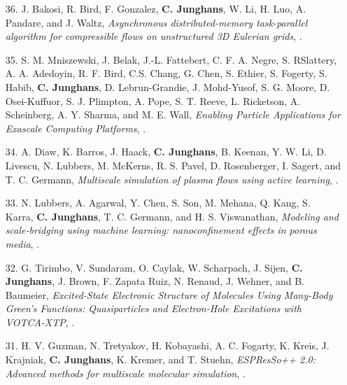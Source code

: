 \documentclass{article}
\begin{document}
\begin{enumerate}
\item[36.] J. Bakosi, R. Bird, F. Gonzalez, \textbf{C. Junghans}, W. Li, H. Luo, A. Pandare, and J. Waltz,
  \textit{Asynchronous distributed-memory task-parallel algorithm for compressible flows on unstructured 3D Eulerian grids},
  .

\item[35.] S. M. Mniszewski, J. Belak, J.-L. Fattebert, C. F. A. Negre, S. RSlattery, A. A. Adedoyin, R. F. Bird, C.S. Chang, G. Chen, S. Ethier, S. Fogerty, S. Habib, \textbf{C. Junghans}, D. Lebrun-Grandie, J. Mohd-Yusof, S. G. Moore, D. Osei-Kuffuor, S. J. Plimpton, A. Pope, S. T. Reeve, L. Ricketson, A. Scheinberg, A. Y. Sharma, and M. E. Wall,
  \textit{Enabling Particle Applications for Exascale Computing Platforms},
  .

\item[34.] A. Diaw, K. Barros, J. Haack, \textbf{C. Junghans}, B. Keenan, Y. W. Li, D. Livescu, N. Lubbers, M. McKerns, R. S. Pavel, D. Rosenberger, I. Sagert, and T. C. Germann, 
  \textit{Multiscale simulation of plasma flows using active learning},
  .

\item[33.] N. Lubbers, A. Agarwal, Y. Chen, S. Son, M. Mehana, Q. Kang, S. Karra, \textbf{C. Junghans}, T. C. Germann, and  H. S. Viswanathan,
  \textit{Modeling and scale‐bridging using machine learning: nanoconfinement effects in porous media},
  .

\item[32.] G. Tirimbo, V. Sundaram, O. Caylak, W. Scharpach, J. Sijen, \textbf{C. Junghans}, J. Brown, F. Zapata Ruiz, N. Renaud, J. Wehner, and B. Baumeier,
  \textit{Excited-State Electronic Structure of Molecules Using Many-Body Green’s Functions: Quasiparticles and Electron-Hole Excitations with VOTCA-XTP},
  .

\item[31.] H. V. Guzman, N. Tretyakov, H. Kobayashi, A. C. Fogarty, K. Kreis, J. Krajniak, \textbf{C. Junghans}, K. Kremer, and T. Stuehn,
  \textit{ESPResSo++ 2.0: Advanced methods for multiscale molecular simulation},
  .


\end{enumerate}
\end{document}
